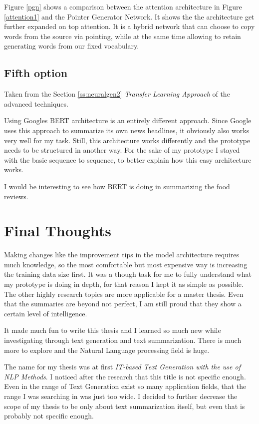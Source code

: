 Figure \ref{pgn} shows a comparison between the attention architecture in Figure \ref{attention1} and the Pointer Generator Network. It shows the the architecture get further expanded on top attention. It is a hybrid network that can choose to copy words from the source via pointing, while at the same time allowing to retain generating words from our fixed vocabulary. 

\subsection{Fifth option}

Taken from the Section \ref{ss:neuralgen2} \textit{Transfer Learning Approach} of the advanced techniques.

Using Googles BERT architecture is an entirely different approach. Since Google uses this approach to summarize its own news headlines, it obviously also works very well for my task. Still, this architecture works differently and the prototype needs to be structured in another way. For the sake of my prototype I stayed with the basic sequence to sequence, to better explain how this easy architecture works.

I would be interesting to see how BERT is doing in summarizing the food reviews.

\section{Final Thoughts}

Making changes like the improvement tips in the model architecture requires much knowledge, so the most comfortable but most expensive way is increasing the training data size first. It was a though task for me to fully understand what my prototype is doing in depth, for that reason I kept it as simple as possible. The other highly research topics are more applicable for a master thesis. Even that the summaries are beyond not perfect, I am still proud that they show a certain level of intelligence. 


It made much fun to write this thesis and I learned so much new while investigating through text generation and text summarization. There is much more to explore and the Natural Language processing field is huge. 

The name for my thesis was at first \textit{IT-based Text Generation with the use of NLP Methods}. I noticed after the research that this title is not specific enough. Even in the range of Text Generation exist so many application fields, that the range I was searching in was just too wide. I decided to further decrease the scope of my thesis to be only about text summarization itself, but even that is probably not specific enough. 

